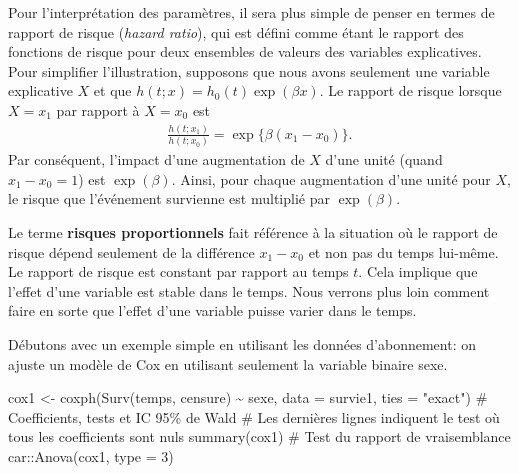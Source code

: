 \documentclass[
  11pt,
  letterpaper,
]{scrbook}
\newenvironment{Shaded}{\begin{snugshade}}{\end{snugshade}}
\newcommand{\AttributeTok}[1]{\textcolor[rgb]{0.40,0.45,0.13}{#1}}
\newcommand{\CommentTok}[1]{\textcolor[rgb]{0.37,0.37,0.37}{#1}}
\newcommand{\DecValTok}[1]{\textcolor[rgb]{0.68,0.00,0.00}{#1}}
\newcommand{\FunctionTok}[1]{\textcolor[rgb]{0.28,0.35,0.67}{#1}}
\newcommand{\NormalTok}[1]{\textcolor[rgb]{0.00,0.23,0.31}{#1}}
\newcommand{\OtherTok}[1]{\textcolor[rgb]{0.00,0.23,0.31}{#1}}
\newcommand{\SpecialCharTok}[1]{\textcolor[rgb]{0.37,0.37,0.37}{#1}}
\newcommand{\StringTok}[1]{\textcolor[rgb]{0.13,0.47,0.30}{#1}}
\theoremstyle{definition}
\theoremstyle{remark}
\begin{document}
Pour l'interprétation des paramètres, il sera plus simple de penser en
termes de rapport de risque (\emph{hazard ratio}), qui est défini comme
étant le rapport des fonctions de risque pour deux ensembles de valeurs
des variables explicatives. Pour simplifier l'illustration, supposons
que nous avons seulement une variable explicative \(X\) et que
\(h(t; x) = h_0(t)\exp(\beta x)\). Le rapport de risque lorsque
\(X=x_1\) par rapport à \(X=x_0\) est \begin{align*}
\frac{h(t; x_1)}{h(t; x_0)} = \exp\{\beta(x_1-x_0)\}.
\end{align*} Par conséquent, l'impact d'une augmentation de \(X\) d'une
unité (quand \(x_1-x_0=1\)) est \(\exp(\beta)\). Ainsi, pour chaque
augmentation d'une unité pour \(X\), le risque que l'événement survienne
est multiplié par \(\exp(\beta)\).

Le terme \textbf{risques proportionnels} fait référence à la situation
où le rapport de risque dépend seulement de la différence \(x_1-x_0\) et
non pas du temps lui-même. Le rapport de risque est constant par rapport
au temps \(t\). Cela implique que l'effet d'une variable est stable dans
le temps. Nous verrons plus loin comment faire en sorte que l'effet
d'une variable puisse varier dans le temps.

Débutons avec un exemple simple en utilisant les données d'abonnement:
on ajuste un modèle de Cox en utilisant seulement la variable binaire
sexe.

\begin{Shaded}
\begin{Highlighting}[]
\NormalTok{cox1 }\OtherTok{\textless{}{-}} \FunctionTok{coxph}\NormalTok{(}\FunctionTok{Surv}\NormalTok{(temps, censure) }\SpecialCharTok{\textasciitilde{}}\NormalTok{ sexe, }
              \AttributeTok{data =}\NormalTok{ survie1,}
              \AttributeTok{ties =} \StringTok{"exact"}\NormalTok{)}
\CommentTok{\# Coefficients, tests et IC 95\% de Wald}
\CommentTok{\# Les dernières lignes indiquent le test où tous les coefficients sont nuls}
\FunctionTok{summary}\NormalTok{(cox1)}
\CommentTok{\# Test du rapport de vraisemblance}
\NormalTok{car}\SpecialCharTok{::}\FunctionTok{Anova}\NormalTok{(cox1, }\AttributeTok{type =} \DecValTok{3}\NormalTok{)}
\end{Highlighting}
\end{Shaded}
\end{document}
